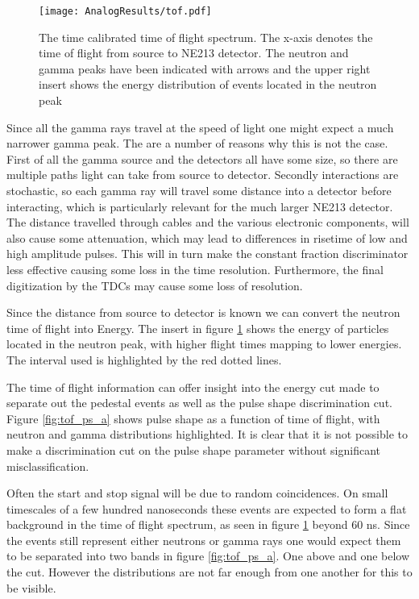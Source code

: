 \documentclass[main.tex]{subfiles}
\begin{document}
\begin{figure}[ht]
    \centering
        \texttt{[image: AnalogResults/tof.pdf]}
        \caption{The time calibrated time of flight spectrum. The x-axis denotes the time of flight from source to NE213 detector. The neutron and gamma peaks have been indicated with arrows and the upper right insert shows the energy distribution of events located in the neutron peak}
    \label{fig:tof_a}
\end{figure}

Since all the gamma rays travel at the speed of light one might expect a much narrower gamma peak. The are a number of reasons why this is not the case. First of all the gamma source and the detectors all have some size, so there are multiple paths light can take from source to detector. Secondly interactions are stochastic, so each gamma ray will travel some distance into a detector before interacting, which is particularly relevant for the much larger NE213 detector. The distance travelled through cables and the various electronic components, will also cause some attenuation, which may lead to differences in risetime of low and high amplitude pulses. This will in turn make the constant fraction discriminator less effective causing some loss in the time resolution. Furthermore, the final  digitization by the TDCs may cause some loss of resolution.

Since the distance from source to detector is known we can convert the neutron time of flight into Energy. The insert in figure \ref{fig:tof_a} shows the energy of particles located in the neutron peak, with higher flight times mapping to lower energies. The interval used is highlighted by the red dotted lines.


The time of flight information can offer insight into the energy cut made to separate out the pedestal events as well as the pulse shape discrimination cut. Figure \ref{fig:tof_ps_a} shows pulse shape as a function of time of flight, with neutron and gamma distributions highlighted. It is clear that it is not possible to make a discrimination cut on the pulse shape parameter without significant misclassification. 

Often the start and stop signal will be due to random coincidences. On small timescales of a few hundred nanoseconds these events are expected to form a flat background in the time of flight spectrum, as seen in figure \ref{fig:tof_a} beyond 60 ns. Since the events still represent either neutrons or gamma rays one would expect them to be separated into two bands in figure \ref{fig:tof_ps_a}. One above and one below the cut. However the distributions are not far enough from one another for this to be visible.
\end{document}

